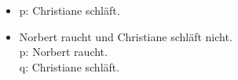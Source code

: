 {\begin{frame}
\begin{table}
\begin{minipage}{0.3\textwidth}
\centering
\begin{itemize}
\item[] \small{p: Christiane schläft.}
\end{itemize}
\end{minipage}
%	
\begin{minipage}{0.65\textwidth}
\centering
\begin{itemize}
\item[] \small{Norbert raucht und Christiane schläft nicht.\\
               p: Norbert raucht.\\
               q: Christiane schläft.}
\end{itemize}
\end{minipage}

\vspace{1em}


\end{table}
\end{frame}}
